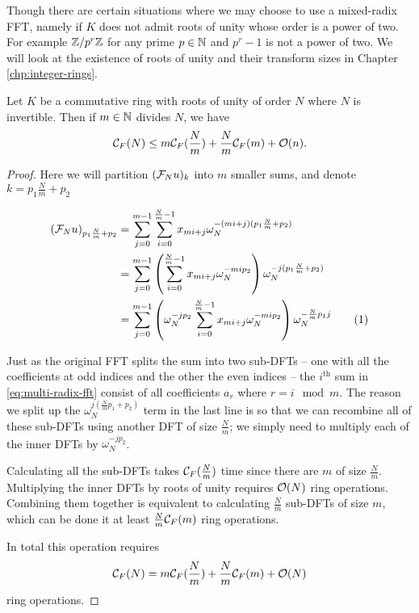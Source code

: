Though there are certain situations where we may choose to use a mixed-radix FFT, namely if $K$ does not admit roots of unity whose order is a power of two. For example ${\mathbb Z}/p^r{\mathbb Z}$ for any prime $p \in {\mathbb N}$ and $p^r - 1$ is not a power of two. We will look at the existence of roots of unity and their transform sizes in Chapter \ref{chp:integer-rings}.

\begin{theorem}\label{thm:mixed-radix-fft}
    Let $K$ be a commutative ring with roots of unity of order $N$ where $N$ is invertible. Then if $m \in {\mathbb N}$ divides $N$, we have
    \[
        \mathcal C_F(N) \le m\mathcal C_F(\frac{N}{m}) + \frac{N}{m}\mathcal C_F(m) + \mathcal O(n).
    \]
\end{theorem}

\begin{proof}
    Here we will partition $(\mathcal F_N u)_k$ into $m$ smaller sums, and denote $k = p_1 \frac{N}{m} + p_2$

    \begin{align*}
        (\M{F}_N u)_{p_1\frac{N}{m} + p_2}
        &= \sum^{m-1}_{j=0} \sum^{\frac{N}{m}-1}_{i=0} x_{mi + j}\omega_N^{-(mi + j)(p_1 \frac{N}{m} + p_2)}\\
        &= \sum^{m-1}_{j=0} \bb{\sum^{\frac{N}{m}-1}_{i=0} x_{mi + j}\omega_N^{-mi p_2}} \omega_N^{-j(p_1\frac{N}{m} + p_2)}\\
        &= \sum^{m-1}_{j=0} \bb{\omega_N^{-jp_2}\sum^{\frac{N}{m}-1}_{i=0} x_{mi + j}\omega_N^{-mi p_2}} \omega_N^{-\frac{N}{m}p_1 j} \stepcounter{equation}\tag{\theequation} \label{eq:multi-radix-fft}
    \end{align*}

    Just as the original FFT splits the sum into two sub-DFTs -- one with all the coefficients at odd indices and the other the even indices -- the $i^{\text{th}}$ sum in \eqref{eq:multi-radix-fft} consist of all coefficients $a_r$ where $r = i \mod m$. The reason we split up the $\omega_N^{j(\frac{N}{m}p_1 + p_2)}$ term in the last line is so that we can recombine all of these sub-DFTs using another DFT of size $\frac{N}{m}$; we simply need to multiply each of the inner DFTs by $\omega_N^{-jp_2}$.

    Calculating all the sub-DFTs takes $\mathcal C_F(\frac{N}{m})$ time since there are $m$ of size $\frac{N}{m}$. Multiplying the inner DFTs by roots of unity requires $\mathcal O(N)$ ring operations. Combining them together is equivalent to calculating $\frac{N}{m}$ sub-DFTs of size $m$, which can be done it at least $\frac{N}{m}\mathcal C_F(m)$ ring operations.

    In total this operation requires
    \[
        \mathcal C_F(N) = m\mathcal C_F(\frac{N}{m}) + \frac{N}{m}\mathcal C_F(m) + \mathcal O(N)
    \]
    ring operations.
\end{proof}

